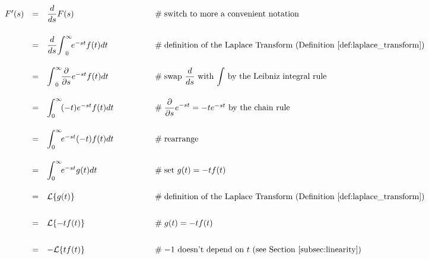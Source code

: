\documentclass{article}
\theoremstyle{definition}
\begin{document}
\bigskip
\begin{equation*}
\begin{array}{lllll}
F^\prime(s)
&=& \dfrac{d}{ds} F(s)                                                                                        &\qquad \qquad \mathrel{\#} \text{switch to more a convenient notation}                                                                    \\
[20pt]
&=& \dfrac{d}{ds} \mathlarger{\int} ^\infty_0 \! e^{-st}  f(t) dt                              &\qquad \qquad \mathrel{\#} \text{definition of the Laplace Transform (Definition \ref{def:laplace_transform})}          \\  
[20pt]
&=& \mathlarger{\int} ^\infty_0 \! \dfrac{\partial}{\partial s} e^{-st}  f(t) dt           &\qquad \qquad \mathrel{\#} \text{swap $\dfrac{d}{ds}$ with $\mathlarger{\int}$ by the Leibniz integral rule}             \\                                                                                    
[20pt]
&=&  \mathlarger{\int}^\infty_0 \! (-t) e^{-st} f(t) dt                                             &\qquad \qquad \mathrel{\#} \mathlarger{\dfrac{\partial}{\partial s} e^{-st}} = -t e^{-st} \text{ by the chain rule}            \\
[20pt]
&=&  \mathlarger{\int}^\infty_0 \! e^{-st}  (-t) f(t) dt                                            &\qquad \qquad \mathrel{\#} \text{rearrange}                                                                                                                \\
[20pt]
&=&  \mathlarger{\int}^\infty_0 \! e^{-st} g(t) dt                                                  &\qquad \qquad \mathrel{\#} \text{set $g(t) = -t f(t)$}                                                                                                    \\
[20pt] 
&=& \mathcal{L}\{g(t)\}                                                                                      &\qquad \qquad \mathrel{\#} \text{definition of the Laplace Transform (Definition \ref{def:laplace_transform})}          \\
[20pt]
&=& \mathcal{L}\{-tf(t)\}                                                                                     &\qquad \qquad \mathrel{\#} g(t) = -t f(t)                                                                                                                       \\
[20pt]
&=& -\mathcal{L}\{tf(t)\}                                                                                    &\qquad \qquad \mathrel{\#} \text{$-1$ doesn't depend on $t$ (see Section \ref{subsec:linearity})}
\end{array}
\end{equation*}
\end{document}

